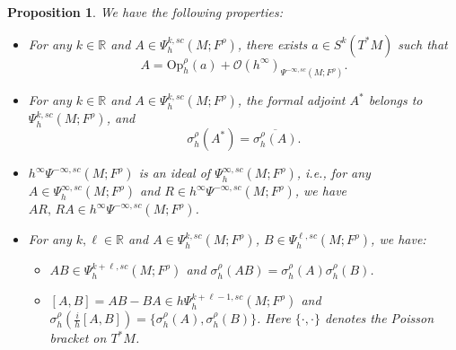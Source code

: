 \documentclass[11pt,oneside,reqno]{amsart}
\newcommand\R{\ensuremath{\mathbb{R}}}
\newtheorem{proposition}[theorem]{Proposition}
\theoremstyle{definition}
\numberwithin{equation}{section}
\theoremstyle{plain}
\begin{document}
\begin{proposition}\label{propofquantization}
We have the following properties:
\begin{itemize}
    \item[(a)] For any $k\in \R$ and $A \in \Psi_h^{k,sc}(M;F^\rho)$, there exists $a\in S^k\left(T^* M\right)$ such that
\begin{equation}\label{pseudoequalsquant}
A=\mathrm{Op}_h^{\rho}(a)+\mathcal{O} (h^{\infty} )_{\Psi^{-\infty,sc}(M;F^\rho)}.
\end{equation}
\item[(b)] For any $k\in \R$ and $A \in \Psi_h^{k,sc}(M;F^\rho)$, the formal adjoint $A^*$ belongs to $\Psi_h^{k,sc}(M;F^\rho)$, and
\begin{equation*}
    \sigma_h^{\rho}\left(A^*\right)=\overline{\sigma_h^{\rho}(A)}.
\end{equation*}
\item[(c)] $h^{\infty}\Psi^{-\infty,sc}(M;F^{\rho})$ is an ideal of $\Psi^{\infty,sc}_h(M;F^{\rho})$, \emph{i.e.}, for any $A \in \Psi^{\infty,sc}_h(M;F^{\rho})$ and $R\in h^{\infty}\Psi^{-\infty,sc}(M;F^{\rho})$, we have $AR,\, RA \in h^{\infty}\Psi^{-\infty,sc}(M;F^{\rho})$.
\item[(d)] For any $k,\ell\in \R$ and $A \in \Psi_h^{k,sc}(M;F^\rho)$, $B \in \Psi_h^{\ell,sc}(M;F^\rho)$, we have:
\begin{itemize}
\item[$\bullet$] $AB \in \Psi_h^{k+\ell,sc}(M;F^\rho)$ and $\sigma^\rho_h (AB)=\sigma^\rho_h (A)\sigma^\rho_h (B)$.
\item[$\bullet$]
$[A,B]=AB-BA \in h\Psi_h^{k+\ell-1,sc}(M;F^\rho)$ and $\sigma_h^{\rho} (\frac{i}{h}[A, B] )  = \{\sigma_h^{\rho}(A), \sigma_h^{\rho}(B) \}$. Here $\{\cdot,\cdot\}$ denotes the Poisson bracket on $T^*M$.
\end{itemize}
\end{itemize}
\end{proposition}
\end{document}
